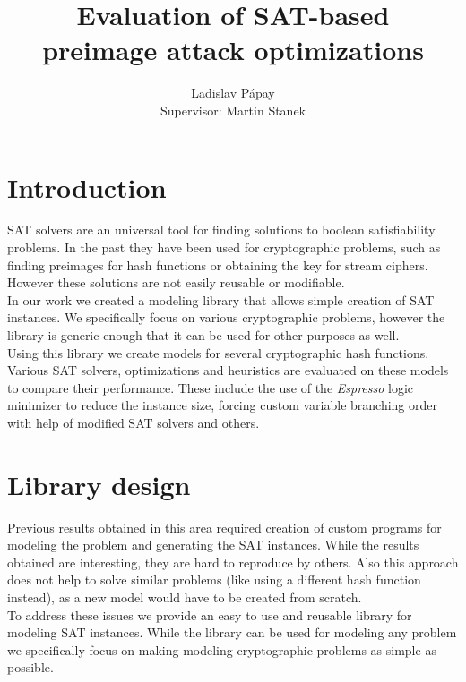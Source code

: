 \documentclass[myposter,portrait]{sciposter}
\def\mysection#1{
{\color{sectionCol}\section*{\sc\bfseries #1}}}
\begin{document}
\setlength{\logowidth}{20cm}
\setlength{\titlewidth}{\textwidth}
\addtolength{\titlewidth}{-\logowidth}
\useleftlogofalse

\color{textCol}

\title{Evaluation of SAT-based\\ preimage attack optimizations}
\author{Ladislav P\'apay\\
        Supervisor: Martin Stanek}
\maketitle

\begin{multicols*}{3}

\mysection{Introduction}
SAT solvers are an universal tool for finding solutions to boolean satisfiability problems.
In the past they have been used for cryptographic problems, such as finding preimages for hash functions or obtaining the key for stream ciphers.
However these solutions are not easily reusable or modifiable.
~\\

In our work we created a modeling library that allows simple creation of SAT instances.
We specifically focus on various cryptographic problems, however the library is generic enough that it can be used for other purposes as well.
~\\

Using this library we create models for several cryptographic hash functions.
Various SAT solvers, optimizations and heuristics are evaluated on these models to compare their performance.
These include the use of the \emph{Espresso} logic minimizer to reduce the instance size, forcing custom variable branching order with help of modified SAT solvers and others.

\mysection{Library design}
Previous results obtained in this area required creation of custom programs for modeling the problem and generating the SAT instances.
While the results obtained are interesting, they are hard to reproduce by others.
Also this approach does not help to solve similar problems (like using a different hash function instead), as a new model would have to be created from scratch.
~\\

To address these issues we provide an easy to use and reusable library for modeling SAT instances.
While the library can be used for modeling any problem we specifically focus on making modeling cryptographic problems as simple as possible.
~\\


\end{multicols*}
\end{document}
